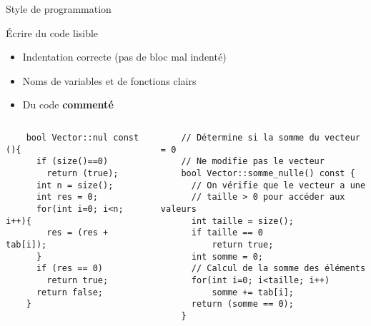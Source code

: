 \begin{frame}[fragile]{Style de programmation}

\begin{block}{Écrire du code lisible}
\begin{itemize}
    \item Indentation correcte (pas de bloc mal indenté)
    \item Noms de variables et de fonctions clairs
    \item Du code \textbf{commenté}
\end{itemize}
\end{block}

\vspace{-1em}
\begin{columns}[T]
    \begin{column}{0.4\textwidth}
    \begin{verbatim}
    bool Vector::nul const (){
      if (size()==0)
        return (true);
      int n = size();
      int res = 0;
      for(int i=0; i<n; i++){
        res = (res + tab[i]);
      }
      if (res == 0)
        return true;
      return false;
    }
    \end{verbatim}
    \end{column}
    \begin{column}{0.6\textwidth}
    \begin{verbatim}
    // Détermine si la somme du vecteur = 0
    // Ne modifie pas le vecteur
    bool Vector::somme_nulle() const {
      // On vérifie que le vecteur a une
      // taille > 0 pour accéder aux valeurs
      int taille = size();
      if taille == 0
          return true;
      int somme = 0;
      // Calcul de la somme des éléments
      for(int i=0; i<taille; i++)
          somme += tab[i];
      return (somme == 0);
    }
    \end{verbatim}
    \end{column}
\end{columns}
\end{frame}


